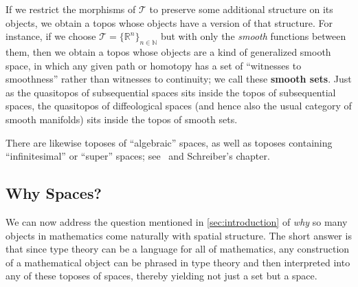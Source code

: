 \documentclass[10pt]{article}
\def\N{\mathbb{N}}
\def\R{\mathbb{R}}
\def\T{\mathcal{T}}
\numberwithin{equation}{section}
\begin{document}
If we restrict the morphisms of $\T$ to preserve some additional structure on its objects, we obtain a topos whose objects have a version of that structure.
For instance, if we choose $\T = \{\R^n\}_{n\in \N}$ but with only the \emph{smooth} functions between them, then we obtain a topos whose objects are a kind of generalized smooth space, in which any given path or homotopy has a set of ``witnesses to smoothness'' rather than witnesses to continuity; we call these \textbf{smooth sets}.
Just as the quasitopos of subsequential spaces sits inside the topos of subsequential spaces, the quasitopos of diffeological spaces (and hence also the usual category of smooth manifolds) sits inside the topos of smooth sets.

There are likewise toposes of ``algebraic'' spaces, as well as toposes containing ``infinitesimal'' or ``super'' spaces; see~\cite{bh:cc-smooth,moerdijk-reyes:sia} and Schreiber's chapter.

\subsection{Why Spaces?}
\label{sec:why-spaces}

We can now address the question mentioned in \cref{sec:introduction} of \emph{why} so many objects in mathematics come naturally with spatial structure.
The short answer is that since type theory can be a language for all of mathematics, any construction of a mathematical object can be phrased in type theory and then interpreted into any of these toposes of spaces, thereby yielding not just a set but a space.
%
%
%
\end{document}
